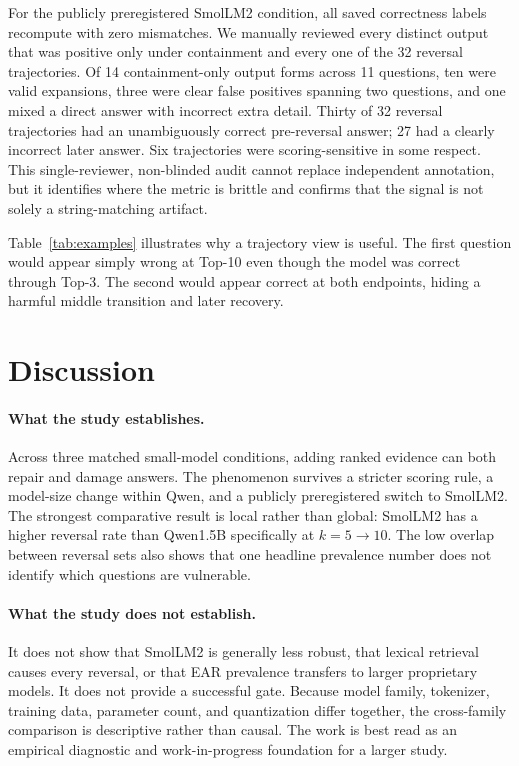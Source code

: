 \documentclass[10pt,twocolumn]{article}
\begin{document}
For the publicly preregistered SmolLM2 condition, all saved correctness labels recompute with zero mismatches. We manually reviewed every distinct output that was positive only under containment and every one of the 32 reversal trajectories. Of 14 containment-only output forms across 11 questions, ten were valid expansions, three were clear false positives spanning two questions, and one mixed a direct answer with incorrect extra detail. Thirty of 32 reversal trajectories had an unambiguously correct pre-reversal answer; 27 had a clearly incorrect later answer. Six trajectories were scoring-sensitive in some respect. This single-reviewer, non-blinded audit cannot replace independent annotation, but it identifies where the metric is brittle and confirms that the signal is not solely a string-matching artifact.

Table~\ref{tab:examples} illustrates why a trajectory view is useful. The first question would appear simply wrong at Top-10 even though the model was correct through Top-3. The second would appear correct at both endpoints, hiding a harmful middle transition and later recovery.

\section{Discussion}

\paragraph{What the study establishes.}
Across three matched small-model conditions, adding ranked evidence can both repair and damage answers. The phenomenon survives a stricter scoring rule, a model-size change within Qwen, and a publicly preregistered switch to SmolLM2. The strongest comparative result is local rather than global: SmolLM2 has a higher reversal rate than Qwen1.5B specifically at $k=5\to10$. The low overlap between reversal sets also shows that one headline prevalence number does not identify which questions are vulnerable.

\paragraph{What the study does not establish.}
It does not show that SmolLM2 is generally less robust, that lexical retrieval causes every reversal, or that EAR prevalence transfers to larger proprietary models. It does not provide a successful gate. Because model family, tokenizer, training data, parameter count, and quantization differ together, the cross-family comparison is descriptive rather than causal. The work is best read as an empirical diagnostic and work-in-progress foundation for a larger study.
\end{document}
